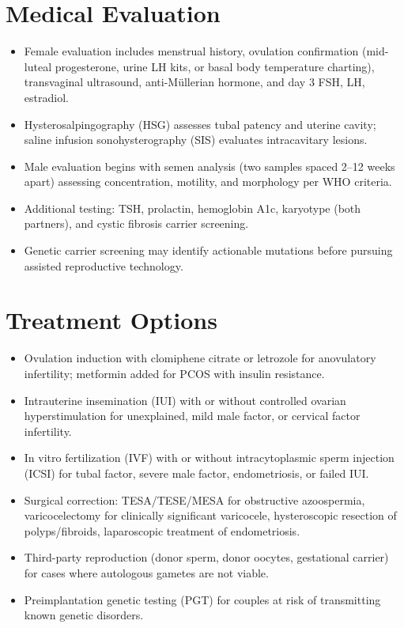 \section*{Medical Evaluation}
\begin{itemize}
  \item Female evaluation includes menstrual history, ovulation confirmation (mid-luteal progesterone, urine LH kits, or basal body temperature charting), transvaginal ultrasound, anti-M\"ullerian hormone, and day 3 FSH, LH, estradiol.
  \item Hysterosalpingography (HSG) assesses tubal patency and uterine cavity; saline infusion sonohysterography (SIS) evaluates intracavitary lesions.
  \item Male evaluation begins with semen analysis (two samples spaced 2--12 weeks apart) assessing concentration, motility, and morphology per WHO criteria.
  \item Additional testing: TSH, prolactin, hemoglobin A1c, karyotype (both partners), and cystic fibrosis carrier screening.
  \item Genetic carrier screening may identify actionable mutations before pursuing assisted reproductive technology.
\end{itemize}

\section*{Treatment Options}
\begin{itemize}
  \item Ovulation induction with clomiphene citrate or letrozole for anovulatory infertility; metformin added for PCOS with insulin resistance.
  \item Intrauterine insemination (IUI) with or without controlled ovarian hyperstimulation for unexplained, mild male factor, or cervical factor infertility.
  \item In vitro fertilization (IVF) with or without intracytoplasmic sperm injection (ICSI) for tubal factor, severe male factor, endometriosis, or failed IUI.
  \item Surgical correction: TESA/TESE/MESA for obstructive azoospermia, varicocelectomy for clinically significant varicocele, hysteroscopic resection of polyps/fibroids, laparoscopic treatment of endometriosis.
  \item Third-party reproduction (donor sperm, donor oocytes, gestational carrier) for cases where autologous gametes are not viable.
  \item Preimplantation genetic testing (PGT) for couples at risk of transmitting known genetic disorders.
\end{itemize}

